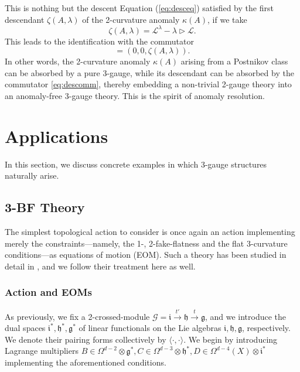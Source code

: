 \documentclass[onecolumn]{article}
\theoremstyle{theorem}
\theoremstyle{remark}
\theoremstyle{example}
\theoremstyle{definition}
\numberwithin{equation}{section}
\def\g{\mathfrak g}
\def\h{\mathfrak h}
\begin{document}
This is nothing but the descent Equation  (\ref{eq:desceq}) satisfied by the first descendant $\zeta(A,\lambda)$ of the 2-curvature anomaly $\kappa(A)$, if we take
\begin{equation}
    \zeta(A,\lambda) = \mathcal{L}^\lambda - \lambda\rhd\mathcal{L}.\nonumber
\end{equation}
{This} leads to the identification with the commutator
\begin{equation}
    [(0,0,\mathcal{L}),(\lambda,0,0)] = (0,0,\zeta(A,\lambda)).\label{eq:descomm}
\end{equation}
{In} other words, the 2-curvature anomaly $\kappa(A)$ arising from a Postnikov class can be absorbed by a pure 3-gauge, while its descendant can be absorbed by the commutator \eqref{eq:descomm}, thereby embedding a non-trivial 2-gauge theory into an { {anomaly-free}} 3-gauge theory. This is the spirit of anomaly resolution.

\section{Applications}\label{sec:3app}
In this section, we discuss concrete examples in which 3-gauge structures naturally arise.

\subsection{3-BF Theory}\label{sec:3actions}
The simplest topological action to consider is once again an action implementing merely the constraints---namely, the 1-, 2-fake-flatness and the flat 3-curvature conditions---as equations of motion (EOM). Such a theory has been studied in detail in  \cite{Radenkovic:2019qme}, and we follow their treatment here as well.



\subsubsection{Action and EOMs} As previously, we fix a 2-crossed-module $\mathscr{G}=\mathfrak{i}\xrightarrow{t'}\h\xrightarrow{t}\g$, and we introduce the dual spaces $\mathfrak{i}^*,\h^*,\g^*$ of linear functionals on the Lie algebras $\mathfrak{i},\h,\g$, respectively. We denote their pairing forms collectively by $\langle\cdot,\cdot\rangle$. We begin by introducing Lagrange multipliers $B\in \Omega^{d-2}\otimes\mathfrak{g}^*,C\in \Omega^{d-3}\otimes\mathfrak{h}^*,D\in\Omega^{d-4}(X)\otimes\mathfrak{i}^*$ implementing the aforementioned conditions.
\end{document}
